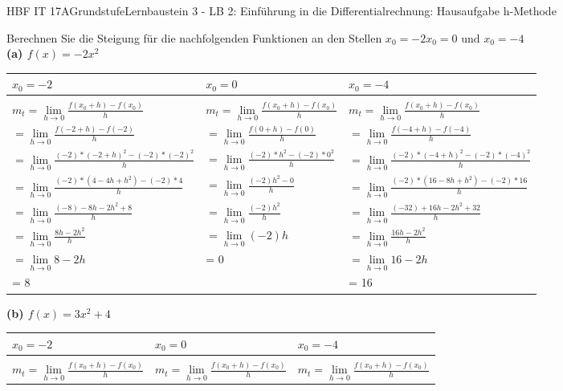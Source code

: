 \documentclass[oneside,openany,headings=optiontotoc,11pt,numbers=noenddot]{scrreprt}
\begin{document}
	\begin{worksheet}{HBF IT 17A}{Grundstufe}{Lernbaustein 3 - LB 2: Einführung in die Differentialrechnung: Hausaufgabe h-Methode}

		\begin{framed}
			\noindent
			\normalsize
			Berechnen Sie die Steigung für die nachfolgenden Funktionen an den Stellen \(x_0 = -2 x_0=0 \text{ und } x_0=-4\)\\
			\textbf{(a) \(f(x) = -2x^{2}\)}\\
			\begin{tabularx}{\textwidth}{X|X|X}
				\(x_0 = -2\) & \(x_0 = 0\) & \(x_0=-4\)\\
				\hline
				\\
				\(m_{t} = \lim\limits_{h \to 0} \frac{f(x_{0}+h) - f(x_0)}{h}\) & \(m_{t} = \lim\limits_{h \to 0} \frac{f(x_{0}+h) - f(x_0)}{h}\) & \(m_{t} = \lim\limits_{h \to 0} \frac{f(x_{0}+h) - f(x_0)}{h}\)\\
				\(=\lim\limits_{h \to 0} \frac{f(-2+h)-f(-2)}{h}\) & \(=\lim\limits_{h \to 0} \frac{f(0+h)-f(0)}{h}\) & \(=\lim\limits_{h \to 0} \frac{f(-4+h)-f(-4)}{h}\)\\
				\(=\lim\limits_{h \to 0} \frac{(-2)*(-2+h)^2 - (-2)*(-2)^2}{h}\) & \(=\lim\limits_{h \to 0} \frac{(-2)*h^2 - (-2)*0^2}{h}\) & \(=\lim\limits_{h \to 0} \frac{(-2)*(-4+h)^2 - (-2)*(-4)^2}{h}\)\\
				\(=\lim\limits_{h \to 0} \frac{(-2)*(4 -4h+h^2) -(-2)*4}{h}\) & \(=\lim\limits_{h \to 0} \frac{(-2)h^2 - 0}{h}\) & \(=\lim\limits_{h \to 0} \frac{(-2)*(16-8h+h^2) -(-2)*16}{h}\)\\
				\(=\lim\limits_{h \to 0}\frac{(-8)-8h-2h^2 +8}{h}\) & \(=\lim\limits_{h \to 0}\frac{(-2)h^2}{h}\) & \(=\lim\limits_{h \to 0}\frac{(-32)+16h-2h^2 +32}{h}\)\\
				\(=\lim\limits_{h \to 0} \frac{8h -2h^2}{h}\) & \(=\lim\limits_{h \to 0}(-2)h\) & \(=\lim\limits_{h \to 0} \frac{16h -2h^2}{h}\)\\
				\(=\lim\limits_{h \to 0} 8 -2h\) & = 0 & \(=\lim\limits_{h \to 0} 16 -2h\)\\
				= 8 & & = 16
			\end{tabularx}
			\textbf{(b) \(f(x) = 3x^2 + 4\)}\\
			\begin{tabularx}{\textwidth}{X|X|X}
				\(x_0 = -2\) & \(x_0 = 0\) & \(x_0=-4\)\\
				\hline
				\\
				\(m_{t} = \lim\limits_{h \to 0} \frac{f(x_{0}+h) - f(x_0)}{h}\) & \(m_{t} = \lim\limits_{h \to 0} \frac{f(x_{0}+h) - f(x_0)}{h}\) & \(m_{t} = \lim\limits_{h \to 0} \frac{f(x_{0}+h) - f(x_0)}{h}\)\\

\end{tabularx}
\end{framed}
\end{worksheet}
\end{document}
